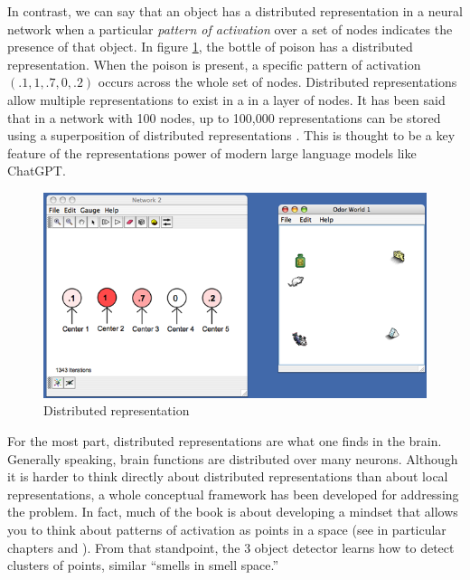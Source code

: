 In contrast, we can say that an object has a distributed representation in a neural network when a particular {\em pattern of activation} over a set of nodes indicates the presence of that object. In figure \ref{distributed},  the bottle of poison has a distributed representation. When the poison is present, a specific pattern of activation $(.1,1,.7,0,.2)$ occurs across the whole set of nodes.   Distributed representations allow multiple representations to exist in a  in a layer of nodes.  It has been said that in a network with 100 nodes, up to 100,000 representations can be stored using a superposition of distributed representations \cite{beckmann2025mechanistic}. This is thought to be a key feature of the representations power of modern large language models like ChatGPT.

\begin{figure}[h]
\centering
\includegraphics[scale=.3]{./images/Distributed_Rep.png}
\caption{Distributed representation}
\label{distributed}
\end{figure}

For the most part, distributed representations are what one finds in the brain. Generally speaking, brain functions are distributed over many neurons. Although it is harder to think directly about distributed representations than about local representations, a whole conceptual framework has been developed for addressing the problem. In fact, much of the book is about developing a mindset that allows you to think about patterns of activation as points in a space (see in particular chapters  and ).  From that standpoint, the 3 object detector learns how to detect clusters of points, similar ``smells in smell space.'' 
